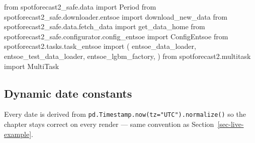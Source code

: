 \documentclass[
  english,
  letterpaper,
]{scrbook}
\newenvironment{Shaded}{\begin{snugshade}}{\end{snugshade}}
\newcommand{\ImportTok}[1]{\textcolor[rgb]{0.00,0.46,0.62}{#1}}
\newcommand{\NormalTok}[1]{\textcolor[rgb]{0.00,0.23,0.31}{#1}}
\begin{document}
\begin{Shaded}
\begin{Highlighting}[]
\ImportTok{from}\NormalTok{ spotforecast2\_safe.data }\ImportTok{import}\NormalTok{ Period}
\ImportTok{from}\NormalTok{ spotforecast2\_safe.downloader.entsoe }\ImportTok{import}\NormalTok{ download\_new\_data}
\ImportTok{from}\NormalTok{ spotforecast2\_safe.data.fetch\_data }\ImportTok{import}\NormalTok{ get\_data\_home}
\ImportTok{from}\NormalTok{ spotforecast2\_safe.configurator.config\_entsoe }\ImportTok{import}\NormalTok{ ConfigEntsoe}
\ImportTok{from}\NormalTok{ spotforecast2.tasks.task\_entsoe }\ImportTok{import}\NormalTok{ (}
\NormalTok{    entsoe\_data\_loader,}
\NormalTok{    entsoe\_test\_data\_loader,}
\NormalTok{    entsoe\_lgbm\_factory,}
\NormalTok{)}
\ImportTok{from}\NormalTok{ spotforecast2.multitask }\ImportTok{import}\NormalTok{ MultiTask}
\end{Highlighting}
\end{Shaded}

\subsection{Dynamic date constants}\label{dynamic-date-constants-1}

Every date is derived from
\texttt{pd.Timestamp.now(tz="UTC").normalize()} so the chapter stays
correct on every render --- same convention as
Section~\ref{sec-live-example}.
\end{document}
